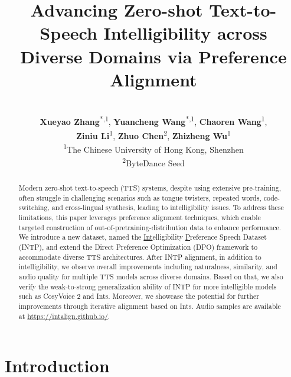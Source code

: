 \documentclass[11pt]{article}
\title{Advancing Zero-shot Text-to-Speech Intelligibility across\\Diverse Domains via Preference Alignment}
\author{
\vspace{-8mm}
\\
 \textbf{Xueyao Zhang}\textsuperscript{*,1},
 \textbf{Yuancheng Wang}\textsuperscript{*,1},
 \textbf{Chaoren Wang}\textsuperscript{1},\\
 \textbf{Ziniu Li}\textsuperscript{1}, 
 \textbf{Zhuo Chen}\textsuperscript{2},
 \textbf{Zhizheng Wu}\textsuperscript{1}
\\
 \textsuperscript{1}The Chinese University of Hong Kong, Shenzhen \\
 \textsuperscript{2}ByteDance Seed
}
\begin{document}
\maketitle

\begin{abstract}
Modern zero-shot text-to-speech (TTS) systems, despite using extensive pre-training, often struggle in challenging scenarios such as tongue twisters, repeated words, code-switching, and cross-lingual synthesis, leading to intelligibility issues. To address these limitations, this paper leverages preference alignment techniques, which enable targeted construction of out-of-pretraining-distribution data to enhance performance. We introduce a new dataset, named the \underline{Int}elligibility \underline{P}reference Speech Dataset (INTP), and extend the Direct Preference Optimization (DPO) framework to accommodate diverse TTS architectures. After INTP alignment, in addition to intelligibility, we observe overall improvements including naturalness, similarity, and audio quality for multiple TTS models across diverse domains. Based on that, we also verify the weak-to-strong generalization ability of INTP for more intelligible models such as CosyVoice 2 and Ints. Moreover, we showcase the potential for further improvements through iterative alignment based on Ints. Audio samples are available at \href{https://intalign.github.io/}{https://intalign.github.io/}.
\end{abstract}

\section{Introduction}

\renewcommand{\thefootnote}{*}

\renewcommand{\thefootnote}{\arabic{footnote}} 
\addtocounter{footnote}{0}%

\end{document}
